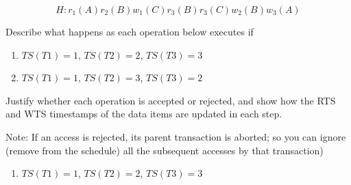 \documentclass{article}
\begin{document}
\begin{enumerate}
    $$ H: r_1(A) r_2(B) w_1(C) r_3(B) r_3(C) w_2(B) w_3(A) $$
    
    Describe what happens as each operation below executes if
    
    \begin{enumerate}
        
        \item $ TS(T1) = 1 $, $ TS(T2) = 2 $, $ TS(T3) = 3 $
        
        \item $ TS(T1) = 1 $, $ TS(T2) = 3 $, $ TS(T3) = 2 $
        
    \end{enumerate}
    
    Justify whether each operation is accepted or rejected, and show how the RTS and WTS timestamps of the data items are updated in each step.

    Note: If an access is rejected, its parent transaction is aborted; so you can ignore (remove from the schedule) all the subsequent accesses by that transaction)
    
    \begin{enumerate}
        
        \item $ TS(T1) = 1 $, $ TS(T2) = 2 $, $ TS(T3) = 3 $
    

\end{enumerate}
\end{enumerate}
\end{document}
